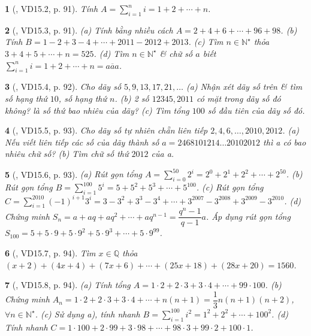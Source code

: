\documentclass{article}
\newtheorem{baitoan}{}
\begin{document}
\begin{baitoan}[\cite{TLCT_THCS_Toan_6_so_hoc}, VD15.2, p. 91]
	Tính $A = \sum_{i=1}^n i = 1 + 2 + \cdots + n$.
\end{baitoan}

\begin{baitoan}[\cite{TLCT_THCS_Toan_6_so_hoc}, VD15.3, p. 91]
	(a) Tính bằng nhiều cách $A = 2 + 4 + 6 + \cdots + 96 + 98$. (b) Tính $B = 1 - 2 + 3 - 4 + \cdots + 2011 - 2012 + 2013$. (c) Tìm $n\in\mathbb{N}^\star$ thỏa $3 + 4 + 5 + \cdots + n = 525$. (d) Tìm $n\in\mathbb{N}^\star$ \& chữ số $a$ biết $\sum_{i=1}^n i = 1 + 2 + \cdots + n = \overline{aaa}$.
\end{baitoan}

\begin{baitoan}[\cite{TLCT_THCS_Toan_6_so_hoc}, VD15.4, p. 92]
	Cho dãy số $5,9,13,17,21,\ldots$ (a) Nhận xét dãy số trên \& tìm số hạng thứ $10$, số hạng thứ $n$. (b) 2 số $12345,2011$ có mặt trong dãy số đó không? là số thứ bao nhiêu của dãy? (c) Tìm tổng $100$ số đầu tiên của dãy số đó.
\end{baitoan}

\begin{baitoan}[\cite{TLCT_THCS_Toan_6_so_hoc}, VD15.5, p. 93]
	Cho dãy số tự nhiên chẵn liên tiếp $2,4,6,\ldots,2010,2012$. (a) Nếu viết liên tiếp các số của dãy thành số $a = 2468101214\ldots20102012$ thì a có bao nhiêu chữ số? (b) Tìm chữ số thứ $2012$ của a.
\end{baitoan}

\begin{baitoan}[\cite{TLCT_THCS_Toan_6_so_hoc}, VD15.6, p. 93]
	(a) Rút gọn tổng $A = \sum_{i=0}^{50} 2^i = 2^0 + 2^1 + 2^2 + \cdots + 2^{50}$. (b) Rút gọn tổng $B = \sum_{i=1}^{100} 5^i = 5 + 5^2 + 5^3 + \cdots + 5^{100}$. (c) Rút gọn tổng $C = \sum_{i=1}^{2010} (-1)^{i+1}3^i = 3 - 3^2 + 3^3 - 3^4 + \cdots + 3^{2007} - 3^{2008} + 3^{2009} - 3^{2010}$. (d) Chứng minh $S_n =  a + aq+ aq^2 + \cdots + aq^{n-1} = \dfrac{q^n - 1}{q - 1}a$. Áp dụng rút gọn tổng $S_{100} = 5 + 5\cdot9 + 5\cdot9^2 + 5\cdot9^3 + \cdots + 5\cdot9^{99}$.
\end{baitoan}

\begin{baitoan}[\cite{TLCT_THCS_Toan_6_so_hoc}, VD15.7, p. 94]
	Tìm $x\in\mathbb{Q}$ thỏa $(x + 2) + (4x + 4) + (7x + 6) + \cdots + (25x + 18) + (28x + 20) = 1560$.
\end{baitoan}

\begin{baitoan}[\cite{TLCT_THCS_Toan_6_so_hoc}, VD15.8, p. 94]
	(a) Tính tổng $A = 1\cdot2 + 2\cdot3 + 3\cdot4 + \cdots + 99\cdot100$. (b) Chứng minh $A_n = 1\cdot2 + 2\cdot3 + 3\cdot4 + \cdots + n(n + 1) = \dfrac{1}{3}n(n + 1)(n + 2)$, $\forall n\in\mathbb{N}^\star$. (c) Sử dụng a), tính nhanh $B = \sum_{i=1}^{100} i^2 = 1^2 + 2^2 + \cdots + 100^2$. (d) Tính nhanh $C = 1\cdot100 + 2\cdot99 + 3\cdot98 + \cdots + 98\cdot3 + 99\cdot2 + 100\cdot1$.
\end{baitoan}
\end{document}

